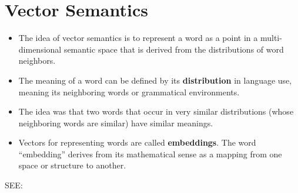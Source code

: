 \section{Vector Semantics \cite{nlp-1}}\label{Vector Semantics}
\begin{itemize}
    \item The idea of vector semantics is to represent a word as a point in a multi-dimensional semantic space that is derived from the distributions of word neighbors.

    \item The meaning of a word can be defined by its \textbf{distribution} in language use, meaning its neighboring words or grammatical environments. 

    \item The idea was that two words that occur in very similar distributions (whose neighboring words are similar) have similar meanings.

    \item Vectors for representing words are called \textbf{embeddings}\label{word embeddings}. The word “embedding” derives from its mathematical sense as a mapping from one space or structure to another.

\end{itemize}

SEE: 













































































